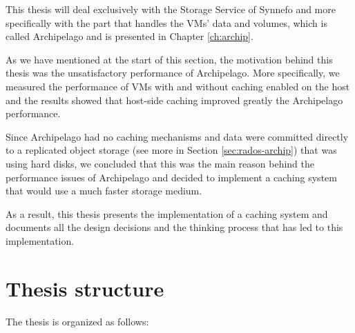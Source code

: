 This thesis will deal exclusively with the Storage Service of Synnefo and more 
specifically with the part that handles the VMs' data and volumes, which is 
called Archipelago and is presented in Chapter \ref{ch:archip}.

As we have mentioned at the start of this section, the motivation behind this 
thesis was the unsatisfactory performance of Archipelago. More specifically, we 
measured the performance of VMs with and without caching enabled on the host 
and the results showed that host-side caching improved greatly the Archipelago 
performance.

Since Archipelago had no caching mechanisms and data were committed directly to 
a replicated object storage (see more in Section \ref{sec:rados-archip}) that 
was using hard disks, we concluded that this was the main reason behind the 
performance issues of Archipelago and decided to implement a caching system 
that would use a much faster storage medium.

As a result, this thesis presents the implementation of a caching system and 
documents all the design decisions and the thinking process that has led to 
this implementation.

\section{Thesis structure}

The thesis is organized as follows:

